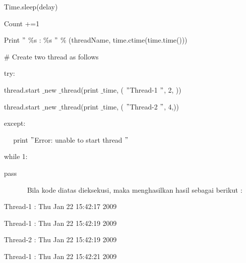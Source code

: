 \documentclass{wileySix}
\begin{document}
\noindent 
{\fontsize{10pt}{10pt}\selectfont  \hspace*{0.5in} Time.sleep(delay)} \par
\noindent 
{\fontsize{10pt}{10pt}\selectfont  \hspace*{0.5in} Count +=1} \par
\noindent 
{\fontsize{10pt}{10pt}\selectfont  \hspace*{0.5in} Print  $ " $ $  \%  $s :  $  \%  $s $ " $  $  \%  $ (threadName, time.ctime(time.time()))} \par
\vspace{10pt}
\noindent 
{\fontsize{10pt}{10pt}\selectfont  $  \#  $ Create two thread as follows} \par
\noindent 
{\fontsize{10pt}{10pt}\selectfont try:} \par
\noindent 
{\fontsize{10pt}{10pt}\selectfont  thread.start $  \_  $new $  \_  $thread(print $  \_  $time, ( $ " $Thread-1 $ " $, 2, ))} \par
\noindent 
{\fontsize{10pt}{10pt}\selectfont  thread.start $  \_  $new $  \_  $thread(print $  \_  $time, ( $ " $Thread-2 $ " $, 4,))} \par
\noindent 
{\fontsize{10pt}{10pt}\selectfont except:} \par
\noindent 
{\fontsize{10pt}{10pt}\selectfont ~~ print  $ " $Error: unable to start thread $ " $} \par
\vspace{10pt}
\noindent 
{\fontsize{10pt}{10pt}\selectfont while 1:} \par
\noindent 
{\fontsize{10pt}{10pt}\selectfont pass} \par
\noindent 
~~~~~~ Bila kode diatas dieksekusi, maka menghasilkan hasil sebagai berikut : \par
\noindent 
\begin{center}{\fontsize{10pt}{10pt}\selectfont Thread-1 : Thu Jan 22 15:42:17 2009}\end{center} \par
\noindent 
\begin{center}{\fontsize{10pt}{10pt}\selectfont Thread-1 : Thu Jan 22 15:42:19 2009}\end{center} \par
\noindent 
\begin{center}{\fontsize{10pt}{10pt}\selectfont Thread-2 : Thu Jan 22 15:42:19 2009}\end{center} \par
\noindent 
\begin{center}{\fontsize{10pt}{10pt}\selectfont Thread-1 : Thu Jan 22 15:42:21 2009}\end{center} \par
\end{document}
